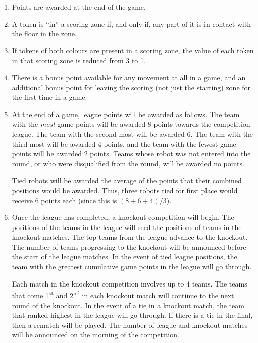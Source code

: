 \begin{enumerate}
\item Points are awarded at the end of the game.

\item A token is ``in'' a scoring zone if, and only if, any part of it is in contact with the floor in the zone.

\item If tokens of both colours are present in a scoring zone, the value of each token in that scoring zone is reduced from 3 to 1.

\item There is a bonus point available for any movement at all in a game, and an additional bonus point for leaving the scoring (not just the starting) zone for the first time in a game.

\item At the end of a game, league points will be awarded as follows.
      The team with the \emph{most} game points will be awarded 8 points towards the competition league.
      The team with the second most will be awarded 6.
      The team with the third most will be awarded 4 points, and the team with the fewest game points will be awarded 2 points.
      Teams whose robot was not entered into the round, or who were disqualified from the round, will be awarded no points.

      Tied robots will be awarded the average of the points that their combined positions would be awarded.
      Thus, three robots tied for first place would receive 6 points each (since this is $(8+6+4)/3$).

\item Once the league has completed, a knockout competition will begin.
      The positions of the teams in the league will seed the positions of teams in the knockout matches.
      The top teams from the league advance to the knockout.
      The number of teams progressing to the knockout will be announced before the start of the league matches.
      In the event of tied league positions, the team with the greatest cumulative game points in the league will go through.

      Each match in the knockout competition involves up to 4 teams.
      The teams that come 1\textsuperscript{st} and 2\textsuperscript{nd} in each knockout match will continue to the next round of the knockout.
      In the event of a tie in a knockout match, the team that ranked highest in the league will go through.
      If there is a tie in the final, then a rematch will be played.
      The number of league and knockout matches will be announced on the morning of the competition.

\end{enumerate}
